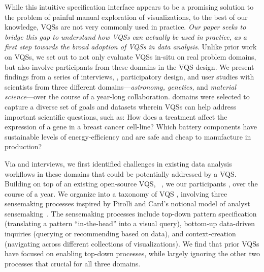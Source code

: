 \par While this intuitive specification interface appears to be a promising solution
to the problem of painful manual exploration of visualizations,
to the best of our knowledge, VQSs are not very commonly used in practice.
{\em Our paper seeks to bridge this gap
to understand how VQSs can actually be used in practice,
as a first step towards the broad adoption of VQSs in data analysis}.
Unlike prior work on VQSs,
we set out to not only evaluate VQSs in-situ on
real problem domains, but also involve participants
from these domains in the VQS design.
We present findings from a series of interviews,
, participatory design,
and user studies with scientists from three different domains---{\em astronomy, genetics,} and {\em material science}---over the course of
a year-long collaboration.  domains were selected to capture
a diverse set of goals
and datasets wherein VQSs can help address
important scientific questions, such as:
How does a treatment affect the expression
of a gene in a breast cancer cell-line?
Which battery components have sustainable
levels of energy-efficiency and are safe and
cheap to manufacture in production?
\par Via  and interviews, we first identified challenges in existing data analysis workflows in these domains
that could be potentially addressed by a VQS. Building on top of an existing open-source VQS, \zv~\cite{Siddiqui2017,Siddiqui2017VLDB}, we  our participants , over the course of a year. We organize  into a taxonomy of VQS , involving three sensemaking processes inspired by Pirolli and Card's notional model of analyst sensemaking~\cite{Pirolli}. The sensemaking processes include top-down pattern specification (translating a pattern ``in-the-head'' into a visual query), bottom-up data-driven inquiries (querying or recommending based on data), and context-creation (navigating across different collections of visualizations). We find that prior VQSs have focused on enabling top-down processes, while largely ignoring the other two processes that  crucial for all three domains.
